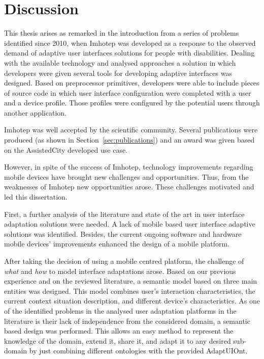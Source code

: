 \section{Discussion}
\label{sec:discussion}

This thesis arises as remarked in the introduction from a series of problems 
identified since 2010, when Imhotep was developed as a response to the observed 
demand of adaptive user interfaces solutions for people with disabilities. 
Dealing with the available technology and analysed approaches a solution in which 
developers were given several tools for developing adaptive interfaces was designed. 
Based on preprocessor primitives, developers were able to include pieces of source 
code in which user interface configuration were completed with a user and a device 
profile. Those profiles were configured by the potential users through another 
application.

Imhotep was well accepted by the scientific community. Several publications
were produced (as shown in Section~\ref{sec:publications}) and an award was 
given based on the AssistedCity developed use case.

However, in spite of the success of Imhotep, technology improvements regarding
mobile devices have brought new challenges and opportunities. Thus, from the 
weaknesses of Imhotep new opportunities arose. These challenges motivated and
led this dissertation.


First, a further analysis of the literature and state of the art in user 
interface adaptation solutions were needed. A lack of mobile based user 
interface adaptive solutions was identified. Besides, the current ongoing 
software and hardware mobile devices' improvements enhanced the design of a 
mobile platform.

After taking the decision of using a mobile centred platform, the challenge of
\textit{what} and \textit{how} to model interface adaptations arose. Based on 
our previous experience and on the reviewed literature, a semantic model based 
on three main entities was designed. This model combines user's interaction
characteristics, the current context situation description, and different
device's characteristics. As one of the identified problems in the analysed user
adaptation platforms in the literature is their lack of independence from the
considered domain, a semantic based design was performed. This allows an easy
method to represent the knowledge of the domain, extend it, share it, and adapt
it to any desired sub-domain by just combining different ontologies with the
provided AdaptUIOnt.

